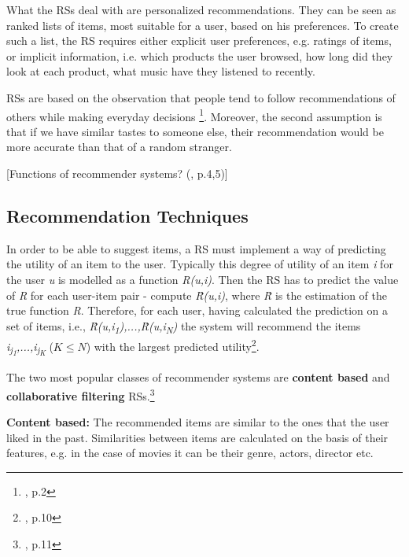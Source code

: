 \documentclass[12pt]{report}
\begin{document}
What the RSs deal with are personalized recommendations. They can be seen as ranked lists of items, most suitable for a user, based on his preferences. To create such a list, the RS requires either explicit user preferences, e.g. ratings of items, or implicit information, i.e. which products the user browsed, how long did they look at each product, what music have they listened to recently.

RSs are based on the observation that people tend to follow recommendations of others while making everyday decisions \footnote{\cite{rec_sys_handbook}, p.2}. Moreover, the second assumption is that if we have similar tastes to someone else, their recommendation would be more accurate than that of a random stranger.

[Functions of recommender systems? (\cite{rec_sys_handbook}, p.4,5)]

\subsection{Recommendation Techniques}

In order to be able to suggest items, a RS must implement a way of predicting the utility of an item to the user. Typically this degree of utility of an item \textit{i} for the user \textit{u} is modelled as a function \textit{R(u,i)}. Then the RS has to predict the value of \textit{R} for each user-item pair - compute \textit{\^{R}(u,i)}, where \textit{\^{R}} is the estimation of the true function \textit{R}. Therefore, for each user, having calculated the prediction on a set of items, i.e., \textit{\^{R}(u,i\textsubscript{1}),...,\^{R}(u,i\textsubscript{N})} the system will recommend the items \textit{i\textsubscript{j\textsubscript{1}},...,i\textsubscript{j\textsubscript{K}}} ($K \leq N$) with the largest predicted utility\footnote{\cite{rec_sys_handbook}, p.10}.

The two most popular classes of recommender systems are {\bf content based} and {\bf collaborative filtering} RSs.\footnote{\cite{rec_sys_handbook}, p.11}

\hbox{}
{\bf Content based:} The recommended items are similar to the ones that the user liked in the past. Similarities between items are calculated on the basis of their features, e.g. in the case of movies it can be their genre, actors, director etc.
\end{document}
